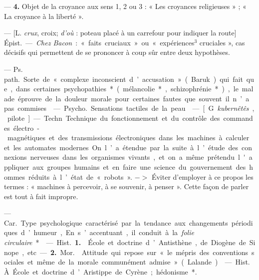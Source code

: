 \begin{itemize}[leftmargin=1cm, label=, itemsep=11pt]
— {\bf 4.}  Objet de la croyance aux
sens 1, 2 ou 3 : « Les croyances religieuses » ; « La croyance à la liberté ».

 — [L. {\it crux}, croix; {\it d’où} : poteau
placé à un carrefour pour indiquer
la route] \si{Épist.} — {\it Chez Bacon} :
« faits cruciaux » ou « expériences$^3$
cruciales », cas décisifs qui permettent de se prononcer à coup sûr entre
deux hypothèses.

 — \si{Ps. path.} Sorte de « complexe inconscient
d’accusation » (Baruk) qui fait que,
dans certaines psychopathies* (mélancolie*, schizophrénie*), le malade
éprouve de la douleur morale pour
certaines fautes que souvent il n’a
pas commises.

 — \si{Psycho.} Sensations tactiles de la peau.

 — [G. {\it kubernêtês}, pilote] —
Techn. Technique du fonctionnement et du contrôle des commandes
électro-magnétiques et des transmissions électroniques dans les machines à calculer et les automates
modernes. On l’a étendue par la suite
à l’étude des connexions nerveuses
dans les organismes vivants, et on a
même prétendu l'appliquer aux
groupes humains et en faire une
science du gouvernement des hommes réduits à l’état de « robots ».
$->$ Éviter d'employer à ce propos
les termes : « machines à percevoir,
à se souvenir, à penser ». Cette façon
de parler est tout à fait impropre.

 — \si{Car.} Type psychologique caractérisé par la tendance
aux changements périodiques d’humeur, En s’accentuant, il conduit à
la {\it folie circulaire}*.

 — \si{Hist.} {\bf 1.}  École et doctrine d’Antisthène, de Diogène de
Sinope, etc.

— {\bf 2.} \si{Mor.}  Attitude qui repose
sur « le mépris des conventions sociales et même de la morale communément admise » (Lalande).

 — \si{Hist.} À. École et doctrine d’Aristippe de Cyrène; hédonisme*.

	\end{itemize}
